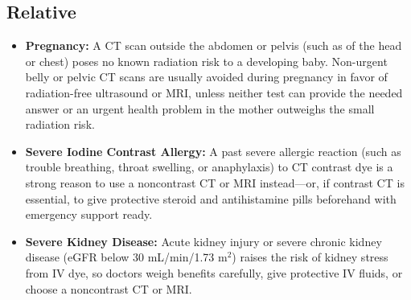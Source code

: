 \subsection{Relative}
\begin{itemize}
    \item \textbf{Pregnancy:} A CT scan outside the abdomen or pelvis (such as of the head or chest) poses no known radiation risk to a developing baby. Non-urgent belly or pelvic CT scans are usually avoided during pregnancy in favor of radiation-free ultrasound or MRI, unless neither test can provide the needed answer or an urgent health problem in the mother outweighs the small radiation risk.
    \item \textbf{Severe Iodine Contrast Allergy:} A past severe allergic reaction (such as trouble breathing, throat swelling, or anaphylaxis) to CT contrast dye is a strong reason to use a noncontrast CT or MRI instead---or, if contrast CT is essential, to give protective steroid and antihistamine pills beforehand with emergency support ready.
    \item \textbf{Severe Kidney Disease:} Acute kidney injury or severe chronic kidney disease (eGFR below 30 mL/min/1.73 m$^2$) raises the risk of kidney stress from IV dye, so doctors weigh benefits carefully, give protective IV fluids, or choose a noncontrast CT or MRI.
\end{itemize}


